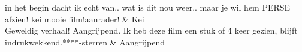 \begin{table}[h]
\begin{tabu}
in het begin dacht ik echt van.. wat is dit nou weer.. maar je wil hem PERSE afzien! kei mooie film!aanrader!                                                                                                                                                                                                                                                                                                                                                                                                                                                                                                                                                                                                                                                                                                                                                                                                                                                                                                                                                                                                                                                                                                                                                                                                                                                                                                                                                                                   & Kei                                  \\ \hline
Geweldig verhaal! Aangrijpend. Ik heb deze film een stuk of 4 keer gezien, blijft indrukwekkend.****-sterren                                                                                                                                                                                                                                                                                                                                                                                                                                                                                                                                                                                                                                                                                                                                                                                                                                                                                                                                                                                                                                                                                                                                                                                                                                                                                                                                                                                  & Aangrijpend                          \\ \hline

\end{tabu}
\end{table}
